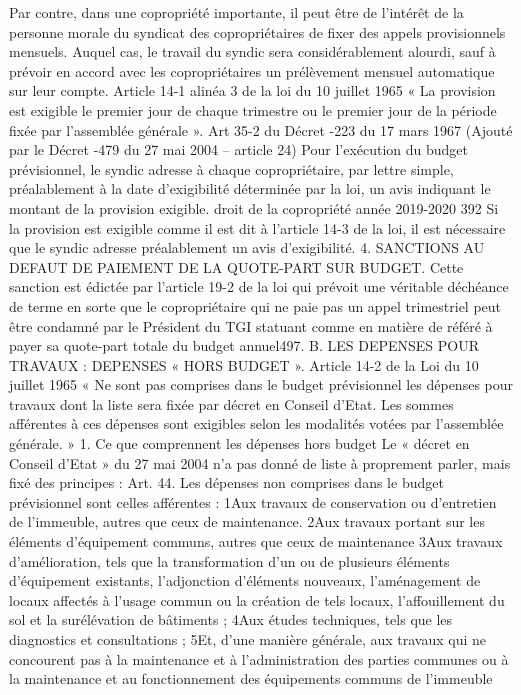 Par contre, dans une copropriété importante, il peut être de l'intérêt de la personne morale du syndicat des copropriétaires de fixer des appels provisionnels mensuels. Auquel cas, le travail du syndic sera considérablement alourdi, sauf à prévoir en accord avec les copropriétaires un prélèvement mensuel automatique sur leur compte.
Article 14-1 alinéa 3 de la loi du 10 juillet 1965
« La provision est exigible le premier jour de chaque trimestre ou le premier jour de la période fixée par l'assemblée générale ».
Art 35-2 du Décret -223 du 17 mars 1967 (Ajouté par le Décret -479 du 27 mai 2004 – article 24)
Pour l'exécution du budget prévisionnel, le syndic adresse à chaque copropriétaire, par lettre simple, préalablement à la date d’exigibilité déterminée par la loi, un avis indiquant le montant de la provision exigible.
droit de la copropriété année 2019-2020
392
Si la provision est exigible comme il est dit à l’article 14-3 de la loi, il est nécessaire que le syndic adresse préalablement un avis d’exigibilité.
4. SANCTIONS AU DEFAUT DE PAIEMENT DE LA QUOTE-PART SUR BUDGET.
Cette sanction est édictée par l’article 19-2 de la loi qui prévoit une véritable déchéance de terme en sorte que le copropriétaire qui ne paie pas un appel trimestriel peut être condamné par le Président du TGI statuant comme en matière de référé à payer sa quote-part totale du budget annuel497.
B. LES DEPENSES POUR TRAVAUX : DEPENSES « HORS BUDGET ».
Article 14-2 de la Loi du 10 juillet 1965
« Ne sont pas comprises dans le budget prévisionnel les dépenses pour travaux dont la liste sera fixée par décret en Conseil d'Etat. Les sommes afférentes à ces dépenses sont exigibles selon les modalités votées par l'assemblée générale. »
1. Ce que comprennent les dépenses hors budget
Le « décret en Conseil d’Etat » du 27 mai 2004 n’a pas donné de liste à proprement parler, mais fixé des principes :
Art. 44. Les dépenses non comprises dans le budget prévisionnel sont celles afférentes :
1\no Aux travaux de conservation ou d'entretien de l'immeuble, autres que ceux de maintenance.
2\no Aux travaux portant sur les éléments d'équipement communs, autres que ceux de maintenance
3\no Aux travaux d'amélioration, tels que la transformation d'un ou de plusieurs éléments d'équipement existants, l'adjonction d'éléments nouveaux, l'aménagement de locaux affectés à l'usage commun ou la création de tels locaux, l’affouillement du sol et la surélévation de bâtiments ;
4\no Aux études techniques, tels que les diagnostics et consultations ;
5\no Et, d'une manière générale, aux travaux qui ne concourent pas à la maintenance et à l'administration des parties communes ou à la maintenance et au fonctionnement des équipements communs de l'immeuble
